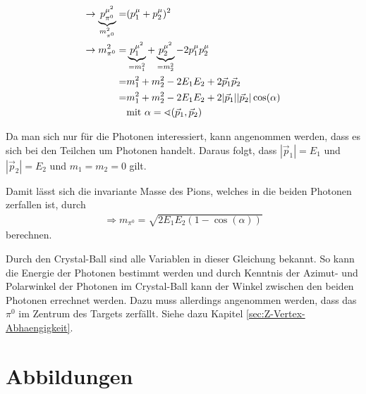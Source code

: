 \documentclass[a4paper,11pt,oneside,final,german,openbib,pdftex]{scrbook}
\begin{document}
{\begin{appendix}
\begin{equation}
\begin{split}
\rightarrow \underbrace{p^{\mu^2}_{\pi^0}}_{m_{\pi^0}^2}=& (p_{1}^{\mu}+p_{2}^{\mu})^2 \\ 
\rightarrow m_{\pi^0}^2=& \underbrace{p_{1}^{\mu^2}}_{=m_1^2}+\underbrace{p_{2}^{\mu^2}}_{=m_2^2}-2p_{1}^{\mu}p_{2}^{\mu} \\ 
=& m_1^2+m_2^2-2E_1E_2+2\vec{p}_1\vec{p}_2 \\ 
=& m_1^2+m_2^2-2E_1E_2+2|\vec{p}_1| |\vec{p}_2| \cos(\alpha) \\
&\textnormal{mit } \alpha=\sphericalangle(\vec{p}_1,\vec{p}_2)
\end{split}
\end{equation}

Da man sich nur f\"ur die Photonen interessiert, kann angenommen werden, dass es sich bei den Teilchen um Photonen handelt. Daraus folgt, dass $|\vec{p}_1|=E_1$ und $|\vec{p}_2|=E_2$ und $m_1=m_2=0$ gilt.

Damit lässt sich die invariante Masse des Pions, welches in die beiden Photonen zerfallen ist, durch
\begin{equation}
\begin{split}
\Rightarrow{m_{\pi^0}=\sqrt{2E_1E_2(1-\cos(\alpha))}}
\label{eq:Formel-zur-Berechnung-der-Invariante-Masse-Herleitung}
\end{split}
\end{equation}
berechnen.

Durch den Crystal-Ball sind alle Variablen in dieser Gleichung bekannt. So kann die Energie der Photonen bestimmt werden und durch Kenntnis der Azimut- und Polarwinkel der Photonen im Crystal-Ball kann der Winkel zwischen den beiden Photonen errechnet werden. Dazu muss allerdings angenommen werden, dass das $\pi^0$ im Zentrum des Targets zerfällt. Siehe dazu Kapitel \ref{sec:Z-Vertex-Abhaengigkeit}.

\section{Abbildungen}

\end{appendix}}
\end{document}
